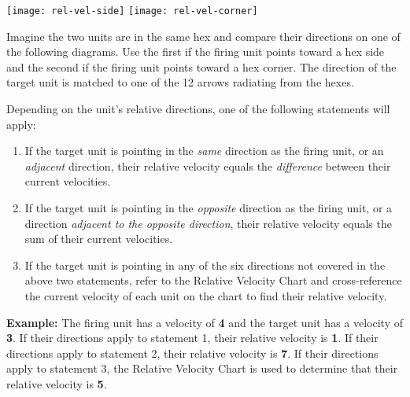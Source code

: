 \begin{minipage}[c]{0.8\textwidth}
  \begin{center}
    \hfill
    \texttt{[image: rel-vel-side]}
    \hfill
    \texttt{[image: rel-vel-corner]}
    \hfill
  \end{center}
\end{minipage}

\begin{bfseries}
  \small Imagine the two units are in the same hex and compare their
  directions on one of the following diagrams. Use the first if the
  firing unit points toward a hex side and the second if the firing
  unit points toward a hex corner. The direction of the target unit is
  matched to one of the 12 arrows radiating from the hexes.
\end{bfseries}

Depending on the unit's relative directions, one of the following
statements will apply:

\begin{enumerate}
\item If the target unit is pointing in the \emph{same} direction as
  the firing unit, or an \emph{adjacent} direction, their relative
  velocity equals the \emph{difference} between their current
  velocities.\label{item:relvel-1}
\item If the target unit is pointing in the \emph{opposite} direction
  as the firing unit, or a direction \emph{adjacent to the opposite
    direction}, their relative velocity equals the sum of their
  current velocities.\label{item:relvel-2}
\item If the target unit is pointing in any of the six directions not
  covered in the above two statements, refer to the Relative Velocity
  Chart and cross-reference the current velocity of each unit on the
  chart to find their relative velocity.\label{item:relvel-3}
\end{enumerate}

\textbf{Example:} The firing unit has a velocity of \textbf{4} and the target
unit has a velocity of \textbf{3}. If their directions apply to statement 1,
their relative velocity is \textbf{1}. If their directions apply to statement
2, their relative velocity is \textbf{7}. If their directions apply to
statement 3, the Relative Velocity Chart is used to determine that
their relative velocity is \textbf{5}.


